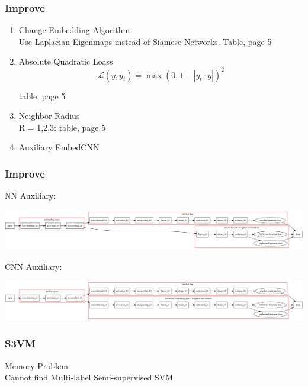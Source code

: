 \documentclass{beamer}
\begin{document}
\begin{frame}
\frametitle{Improve}

\begin{enumerate}
\item Change Embedding Algorithm \\ 

Use Laplacian Eigenmaps instead of Siamese Networks. Table, page 5

\item Absolute Quadratic Loass  \\

$$ \mathcal{L}(y, y_t) = \max(0, 1 - |y_t \cdot y|)^2 $$

table, page 5\\

\item Neighbor Radius\\
R = 1,2,3: table, page 5\\

\item Auxiliary EmbedCNN\\
\end{enumerate}

\end{frame}
\begin{frame}
\frametitle{Improve}

NN Auxiliary:

\begin{center}
\includegraphics[width=\linewidth]{fig11.png}
\end{center}

CNN Auxiliary:

\begin{center}
\includegraphics[width=\linewidth]{fig12.png}
\end{center}

\end{frame}
\begin{frame}
\frametitle{S3VM}

Memory Problem\\

Cannot find Multi-label Semi-supervised SVM\\

\end{frame}
\end{document}
